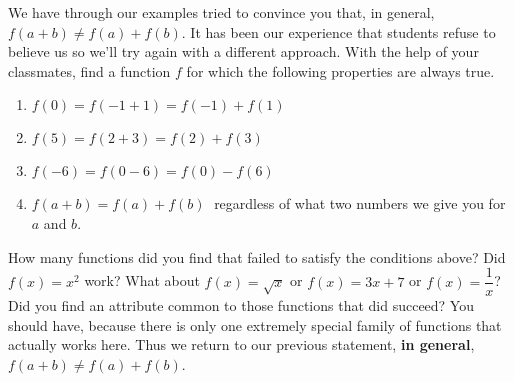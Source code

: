 {\item We have through our examples tried to convince you that, in general, $f(a + b) \neq f(a) + f(b)$.  It has been our experience that students refuse to believe us so we'll try again with a different approach.  With the help of your classmates, find a function $f$ for which the following properties are always true.

\begin{enumerate}

\item $f(0) = f(-1 + 1) = f(-1) + f(1)$
\item $f(5) = f(2 + 3) = f(2) + f(3)$
\item $f(-6) = f(0 - 6) = f(0) - f(6)$
\item $f(a + b) = f(a) + f(b)\;$ regardless of what two numbers we give you for $a$ and  $b$.

\end{enumerate}

How many functions did you find that failed to satisfy the conditions above?  Did $f(x) = x^{2}$ work?  What about $f(x) = \sqrt{x}$ or $f(x) = 3x + 7$ or $f(x) = \dfrac{1}{x}$?  Did you find an attribute common to those functions that did succeed?  You should have, because there is only one extremely special family of functions that actually works here.  Thus we return to our previous statement, {\bf in general}, $f(a + b) \neq f(a) + f(b)$.

}
{}